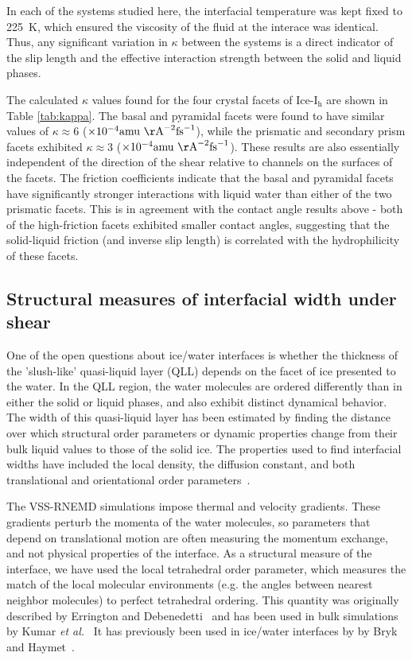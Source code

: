In each of the systems studied here, the interfacial temperature was
kept fixed to 225~K, which ensured the viscosity of the fluid at the
interace was identical. Thus, any significant variation in $\kappa$
between the systems is a direct indicator of the slip length and the
effective interaction strength between the solid and liquid phases.

The calculated $\kappa$ values found for the four crystal facets of
Ice-I$_\mathrm{h}$ are shown in Table \ref{tab:kappa}. The basal and
pyramidal facets were found to have similar values of $\kappa \approx
6$ ($\times 10^{-4} \mathrm{amu~\AA}^{-2}\mathrm{fs}^{-1}$), while the
prismatic and secondary prism facets exhibited $\kappa \approx 3$
($\times 10^{-4} \mathrm{amu~\AA}^{-2}\mathrm{fs}^{-1}$). These
results are also essentially independent of the direction of the shear
relative to channels on the surfaces of the facets.  The friction
coefficients indicate that the basal and pyramidal facets have
significantly stronger interactions with liquid water than either of
the two prismatic facets.  This is in agreement with the contact angle
results above - both of the high-friction facets exhibited smaller
contact angles, suggesting that the solid-liquid friction (and inverse
slip length) is correlated with the hydrophilicity of these facets.

\subsection{Structural measures of interfacial width under shear}
One of the open questions about ice/water interfaces is whether the
thickness of the 'slush-like' quasi-liquid layer (QLL) depends on the
facet of ice presented to the water.  In the QLL region, the water
molecules are ordered differently than in either the solid or liquid
phases, and also exhibit distinct dynamical behavior.  The width of
this quasi-liquid layer has been estimated by finding the distance
over which structural order parameters or dynamic properties change
from their bulk liquid values to those of the solid ice.  The
properties used to find interfacial widths have included the local
density, the diffusion constant, and both translational and
orientational order
parameters~\cite{Karim88,Karim90,Hayward01,Hayward02,Bryk02,Gay02,Louden13}.

The VSS-RNEMD simulations impose thermal and velocity gradients.
These gradients perturb the momenta of the water molecules, so
parameters that depend on translational motion are often measuring the
momentum exchange, and not physical properties of the interface.  As a
structural measure of the interface, we have used the local
tetrahedral order parameter, which measures the match of the local
molecular environments (e.g. the angles between nearest neighbor
molecules) to perfect tetrahedral ordering.  This quantity was
originally described by Errington and Debenedetti~\cite{Errington01}
and has been used in bulk simulations by Kumar \textit{et
  al.}~\cite{Kumar09} It has previously been used in ice/water
interfaces by by Bryk and Haymet~\cite{Bryk04b}.

